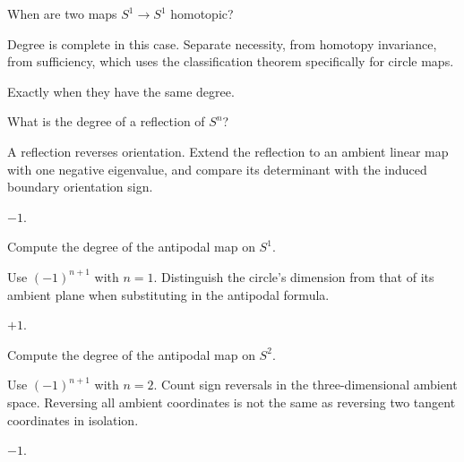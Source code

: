 \begin{exercise}\label{exr:viii03-11}
When are two maps \(S^1\to S^1\) homotopic?
\end{exercise}
\begin{hint}Degree is complete in this case.
Separate necessity, from homotopy invariance, from sufficiency, which uses the classification theorem specifically for circle maps.
\end{hint}
\begin{solution}
Exactly when they have the same degree.
\end{solution}

\begin{exercise}\label{exr:viii03-12}
What is the degree of a reflection of \(S^n\)?
\end{exercise}
\begin{hint}A reflection reverses orientation.
Extend the reflection to an ambient linear map with one negative eigenvalue, and compare its determinant with the induced boundary orientation sign.
\end{hint}
\begin{solution}
\(-1\).
\end{solution}

\begin{exercise}\label{exr:viii03-13}
Compute the degree of the antipodal map on \(S^1\).
\end{exercise}
\begin{hint}Use \((-1)^{n+1}\) with \(n=1\).
Distinguish the circle's dimension from that of its ambient plane when substituting in the antipodal formula.
\end{hint}
\begin{solution}
\(+1\).
\end{solution}

\begin{exercise}\label{exr:viii03-14}
Compute the degree of the antipodal map on \(S^2\).
\end{exercise}
\begin{hint}Use \((-1)^{n+1}\) with \(n=2\).
Count sign reversals in the three-dimensional ambient space. Reversing all ambient coordinates is not the same as reversing two tangent coordinates in isolation.
\end{hint}
\begin{solution}
\(-1\).
\end{solution}

